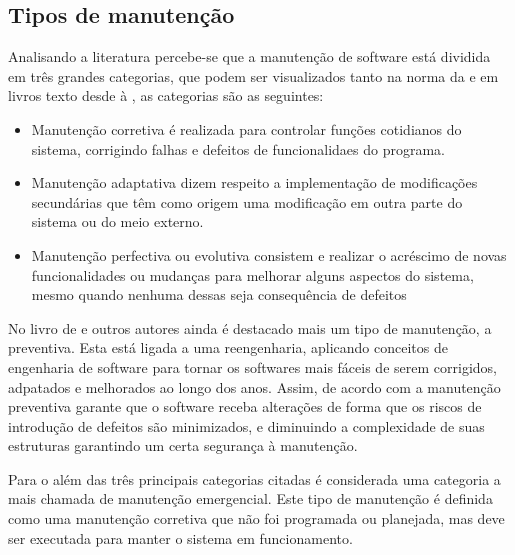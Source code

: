 \subsection{Tipos de manutenção}

Analisando a literatura percebe-se que a manutenção de software está dividida em três grandes categorias, que podem ser visualizados tanto na norma da \cite{ieee1219} e em livros texto desde \cite{lientz1980software} à \cite{pfleeger2004engenharia}, as categorias são as seguintes:
\begin{itemize}
\item Manutenção corretiva é realizada para controlar funções cotidianos do sistema, corrigindo falhas e defeitos de funcionalidaes do programa.

\item Manutenção adaptativa dizem respeito a implementação de modificações secundárias que têm como origem uma modificação em outra parte do sistema ou do meio externo.

\item Manutenção perfectiva ou evolutiva consistem e realizar o acréscimo de novas funcionalidades ou mudanças para melhorar alguns aspectos do sistema, mesmo quando nenhuma dessas seja consequência de defeitos
\end{itemize}

No livro de \cite{pressman2011engenharia} e outros autores ainda é destacado mais um tipo de manutenção, a preventiva. Esta está ligada a uma reengenharia, aplicando conceitos de engenharia de software para tornar os softwares mais fáceis de serem corrigidos, adpatados e melhorados ao longo dos anos. Assim, de acordo com \cite{criscuolo2008qualidade} a manutenção preventiva garante que o software receba alterações de forma que os riscos de introdução de defeitos são minimizados, e diminuindo a complexidade de suas estruturas garantindo um certa segurança à manutenção.


Para o \cite{ieee1219} além das três principais categorias citadas é considerada uma categoria a mais chamada de manutenção emergencial. Este tipo de manutenção é definida como uma manutenção corretiva que não foi programada ou planejada, mas deve ser executada para manter o sistema em funcionamento.